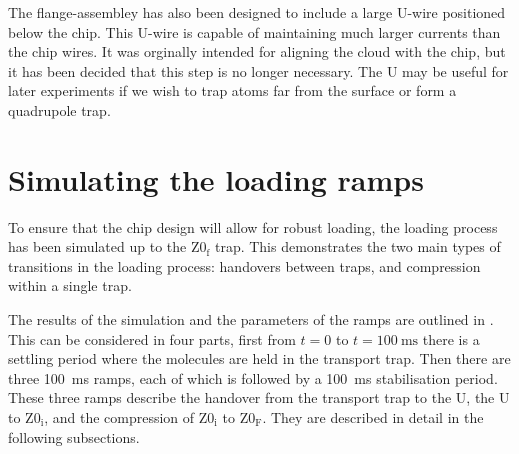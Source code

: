 \begin{figure}[h]
\vspace{0.8cm}
\centering
  \caption{}
  \label{design:fig:chip}
\end{figure}

The flange-assembley  has also been designed to include a
large U-wire positioned below the chip. This U-wire is capable of maintaining
much larger currents than the chip wires. It was orginally intended for
aligning the cloud with the chip, but it has been decided that this step is no
longer necessary. The U may be useful for later experiments if we wish to trap
atoms far from the surface or form a quadrupole trap.


\section{Simulating the loading ramps}
\label{design:sim}

To ensure that the chip design will allow for robust loading, the loading
process has been simulated up to the $\mathrm{Z0_f}$ trap. This demonstrates
the two main types of transitions in the loading process: handovers between
traps, and compression within a single trap.

The results of the simulation and the parameters of the ramps are outlined in
. This can be considered in four parts, first
from $t = 0$ to $t=\SI{100}{\milli\second}$ there is a settling period where
the molecules are held in the transport trap. Then there are three
\SI{100}{\milli\second} ramps, each of which is followed by a
\SI{100}{\milli\second} stabilisation period. These three ramps describe the
handover from the transport trap to the U, the U to $\mathrm{Z0_i}$, and the
compression of $\mathrm{Z0_i}$ to $\mathrm{Z0_F}$. They are described in detail
in the following subsections.

